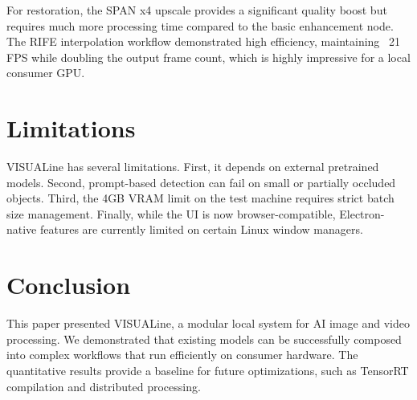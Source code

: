 \documentclass[11pt,a4paper]{article}
\begin{document}
For restoration, the SPAN x4 upscale provides a significant quality boost but requires much more processing time compared to the basic enhancement node. The RIFE interpolation workflow demonstrated high efficiency, maintaining ~21 FPS while doubling the output frame count, which is highly impressive for a local consumer GPU.

\section{Limitations}

VISUALine has several limitations. First, it depends on external pretrained models. Second, prompt-based detection can fail on small or partially occluded objects. Third, the 4GB VRAM limit on the test machine requires strict batch size management. Finally, while the UI is now browser-compatible, Electron-native features are currently limited on certain Linux window managers.

\section{Conclusion}

This paper presented VISUALine, a modular local system for AI image and video processing. We demonstrated that existing models can be successfully composed into complex workflows that run efficiently on consumer hardware. The quantitative results provide a baseline for future optimizations, such as TensorRT compilation and distributed processing.



\end{document}

